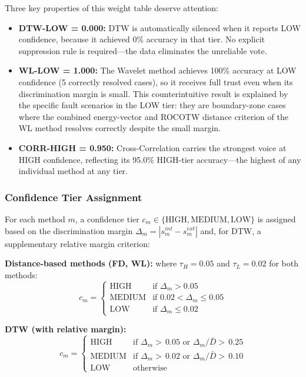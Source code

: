 \documentclass[journal]{IEEEtran}
\begin{document}
Three key properties of this weight table deserve attention:

\begin{itemize}
    \item \textbf{DTW-LOW = 0.000:} DTW is automatically silenced when
    it reports LOW confidence, because it achieved 0\% accuracy in that
    tier. No explicit suppression rule is required---the data eliminates
    the unreliable vote.

    \item \textbf{WL-LOW = 1.000:} The Wavelet method achieves 100\%
    accuracy at LOW confidence (5 correctly resolved cases), so it
    receives full trust even when its discrimination margin is small.
    This counterintuitive result is explained by the specific fault
    scenarios in the LOW tier: they are boundary-zone cases where the
    combined energy-vector and ROCOTW distance criterion of the WL
    method resolves correctly despite the small margin.

    \item \textbf{CORR-HIGH = 0.950:} Cross-Correlation carries the
    strongest voice at HIGH confidence, reflecting its 95.0\%
    HIGH-tier accuracy---the highest of any individual method at any
    tier.
\end{itemize}

\subsubsection{Confidence Tier Assignment}

For each method $m$, a confidence tier $c_m \in \{\text{HIGH},
\text{MEDIUM}, \text{LOW}\}$ is assigned based on the discrimination
margin $\Delta_m = |s_m^{int} - s_m^{ext}|$ and, for DTW, a
supplementary relative margin criterion:

\textbf{Distance-based methods (FD, WL):}
where $\tau_H = 0.05$ and $\tau_L = 0.02$ for both methods:
\begin{equation}
c_m = \begin{cases}
\text{HIGH}   & \text{if } \Delta_m > 0.05 \\
\text{MEDIUM} & \text{if } 0.02 < \Delta_m \leq 0.05 \\
\text{LOW}    & \text{if } \Delta_m \leq 0.02
\end{cases}
\end{equation}

\textbf{DTW (with relative margin):}
\begin{equation}
c_m = \begin{cases}
\text{HIGH}   & \text{if } \Delta_m {>}\,0.05
                \text{ or } \Delta_m/\bar{D} {>}\,0.25 \\
\text{MEDIUM} & \text{if } \Delta_m {>}\,0.02
                \text{ or } \Delta_m/\bar{D} {>}\,0.10 \\
\text{LOW}    & \text{otherwise}
\end{cases}
\end{equation}
\end{document}
